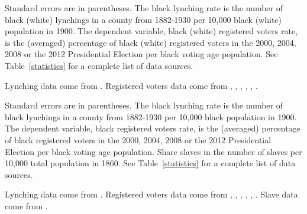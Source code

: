 \documentclass[AEJ, finalmode]{AEA}
\begin{document}
\begin{table}
		\caption{The Association between Lynching Rates and Political Participation among Blacks}
			
			\begin{tablenotes}   
			Standard errors are in parentheses. The black lynching rate is the number of black (white) lynchings in a county from 1882-1930 per 10,000 black (white) population in 1900. The dependent variable, black (white) registered voters rate, is the (averaged) percentage of black (white) registered voters in the 2000, 2004, 2008 or the 2012 Presidential Election per black voting age population. See Table~\ref{statistics} for a complete list of data sources.                                           
			\end{tablenotes}
			\begin{tablenotes}[Source]
			Lynching data come from . Registered voters data come from , , , , , . 
			\end{tablenotes}
		\label{falsifications}%
\end{table}



\begin{table}
		\caption{The Association between Lynching Rates and Political Participation among Blacks Controlling for Slaves}
			
			\begin{tablenotes}   
			Standard errors are in parentheses. The black lynching rate is the number of black lynchings in a county from 1882-1930 per 10,000 black population in 1900. The dependent variable, black registered voters rate, is the (averaged) percentage of black registered voters in the 2000, 2004, 2008 or the 2012 Presidential Election per black voting age population. Share slaves in the number of slaves per 10,000 total population in 1860. See Table~\ref{statistics} for a complete list of data sources.                                           
			\end{tablenotes}
			\begin{tablenotes}[Source]
				Lynching data come from . Registered voters data come from , , , , , . Slave data come from . 
			\end{tablenotes}
		\label{slaves}%
	\end{table}
\end{document}
